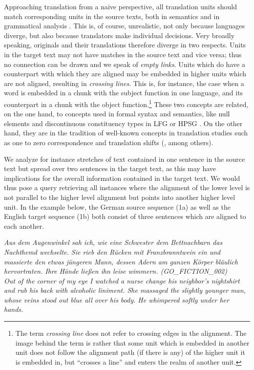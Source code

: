 \documentclass[output=paper]{LSP/langsci}
\begin{document}
Approaching translation from a naive perspective, all translation units should match corresponding units in the source texts, both in semantics and in grammatical analysis \citep{Padó2007}. This is, of course, unrealistic, not only because languages diverge, but also because translators make individual decisions. Very broadly speaking, originals and their translations therefore diverge in two respects. Units in the target text may not have matches in the source text and vice versa; thus no connection can be drawn and we speak of \textit{empty links}. Units which do have a counterpart with which they are aligned may be embedded in higher units which are not aligned, resulting in \textit{crossing lines}. This is, for instance, the case when a word is embedded in a chunk with the subject function in one language, and its counterpart in a chunk with the object function.\footnote{The term \textit{crossing line} does not refer to crossing edges in the alignment. The image behind the term is rather that some unit which is embedded in another unit does not follow the alignment path (if there is any) of the higher unit it is embedded in, but ``crosses a line'' and enters the realm of another unit.} These two concepts are related, on the one hand, to concepts used in formal syntax and semantics, like null elements and discontinuous constituency types in LFG \citep{Bresnan1982} or HPSG \citep{Pollard1994}. On the other hand, they are in the tradition of well-known concepts in translation studies such as one to zero correspondence and translation shifts (\citealt{Koller2001,Vinay1958,Catford1965,Newmark1988,Leuven-Zwart1989,Cyrus2006}, among others).


We analyze for instance stretches of text contained in one sentence in the source text but spread over two sentences in the target text, as this may have implications for the overall information contained in the target text. We would thus pose a query retrieving all instances where the alignment of the lower level is not parallel to the higher level alignment but points into another higher level unit. In the example below, the German source sequence (1a) as well as the English target sequence (1b) both consist of three sentences which are aligned to each another.

\ea\label{ex:culo:1}
    \ea \textit{Aus dem Augenwinkel sah ich, wie eine Schwester dem Bettnachbarn das Nachthemd   wechselte. Sie rieb den Rücken mit Franzbranntwein ein und massierte den etwas   jüngeren Mann, dessen Adern am ganzen Körper bläulich hervortraten. Ihre Hände   ließen ihn leise wimmern. \textup{(GO\_FICTION\_002)}}\\
    \ex \textit{Out of the corner of my eye I watched a nurse change his neighbor's nightshirt and rub   his back with alcoholic liniment. She massaged the slightly younger man, whose veins   stood out blue all over his body. He whimpered softly under her hands.}
    \z
\z
\end{document}
